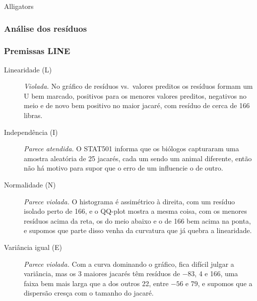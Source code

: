 \begin{dataset}{Alligators}

\subsubsection{Análise dos resíduos}




\subsubsection{Premissas LINE}

\begin{description}
    \item[Linearidade (L)] \textit{Violada.} No gráfico de resíduos vs.\ valores preditos os resíduos formam um U bem marcado, positivos para os menores valores preditos, negativos no meio e de novo bem positivo no maior jacaré, com resíduo de cerca de 166 libras.
    \item[Independência (I)] \textit{Parece atendida.} O STAT501 informa que os biólogos capturaram uma amostra aleatória de 25 jacarés, cada um sendo um animal diferente, então não há motivo para supor que o erro de um influencie o de outro.
    \item[Normalidade (N)] \textit{Parece violada.} O histograma é assimétrico à direita, com um resíduo isolado perto de 166, e o QQ-plot mostra a mesma coisa, com os menores resíduos acima da reta, os do meio abaixo e o de 166 bem acima na ponta, e supomos que parte disso venha da curvatura que já quebra a linearidade.
    \item[Variância igual (E)] \textit{Parece violada.} Com a curva dominando o gráfico, fica difícil julgar a variância, mas os 3 maiores jacarés têm resíduos de $-83$, 4 e 166, uma faixa bem mais larga que a dos outros 22, entre $-56$ e 79, e supomos que a dispersão cresça com o tamanho do jacaré.
\end{description}


\end{dataset}
